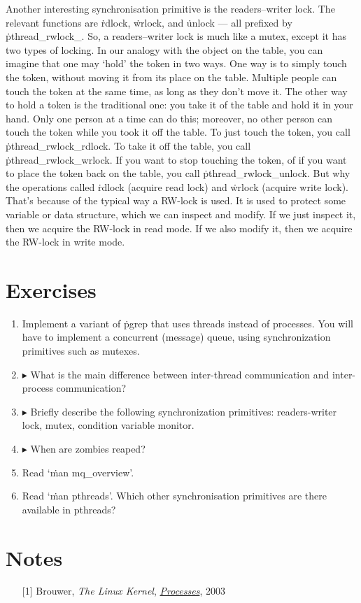Another interesting synchronisation primitive is the readers--writer lock.
The relevant functions are
  \.{rdlock}, \.{wrlock}, and \.{unlock}
  --- all prefixed by \.{pthread\_rwlock\_}.
So, a readers--writer lock is much like a mutex, except it has two types of locking.
In our analogy with the object on the table,
  you can imagine that one may `hold' the token in two ways.
One way is to simply touch the token, without moving it from its place on the table.
Multiple people can touch the token at the same time,
  as long as they don't move it.
The other way to hold a token is the traditional one:
  you take it of the table and hold it in your hand.
Only one person at a time can do this;
  moreover, no other person can touch the token while you took it off the table.
To just touch the token, you call \.{pthread\_rwlock\_rdlock}.
To take it off the table, you call \.{pthread\_rwlock\_wrlock}.
If you want to stop touching the token,
  of if you want to place the token back on the table,
  you call \.{pthread\_rwlock\_unlock}.
But why the operations called \.{rdlock} (acquire read lock)
  and \.{wrlock} (acquire write lock).
That's because of the typical way a RW-lock is used.
It is used to protect some variable or data structure,
  which we can inspect and modify.
If we just inspect it, then we acquire the RW-lock in read mode.
If we also modify it, then we acquire the RW-lock in write mode.


\section{Exercises}

\begin{enumerate}
\item
  Implement a variant of \.{pgrep} that uses threads instead of processes.
  You will have to implement a concurrent (message) queue,
    using synchronization primitives such as mutexes.
\item
  $\blacktriangleright$
  What is the main difference
    between inter-thread communication and inter-process communication?
\item
  $\blacktriangleright$
  Briefly describe the following synchronization primitives:
    readers-writer lock,
    mutex,
    condition variable
    monitor.
\item
  $\blacktriangleright$
  When are zombies reaped?
\item
  Read `\.{man mq\_overview}'.
\item
  Read `\.{man pthreads}'.
  Which other synchronisation primitives are there available in pthreads?
\end{enumerate}


\section{Notes}

\begin{itemize}
\item[{[1]}]
  Brouwer,
  \emph{The Linux Kernel},
  \href{https://www.win.tue.nl/~aeb/linux/lk/lk-10.html}{\emph{Processes}},
  2003
\end{itemize}



